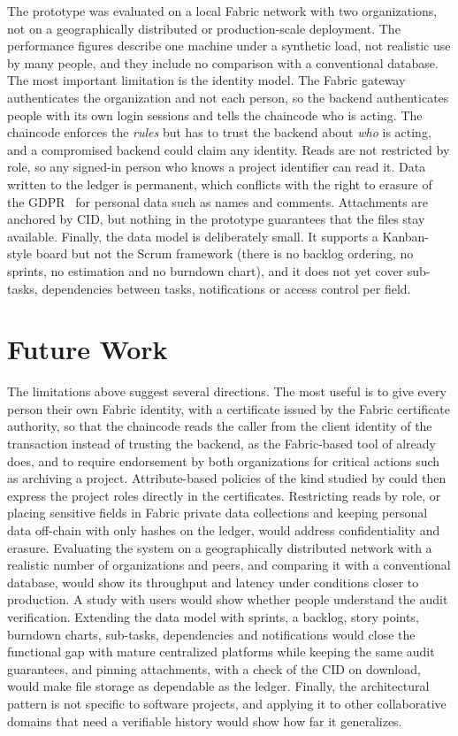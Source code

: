 The prototype was evaluated on a local Fabric network with two organizations, not on a geographically distributed or production-scale deployment. The performance figures describe one machine under a synthetic load, not realistic use by many people, and they include no comparison with a conventional database. The most important limitation is the identity model. The Fabric gateway authenticates the organization and not each person, so the backend authenticates people with its own login sessions and tells the chaincode who is acting. The chaincode enforces the \emph{rules} but has to trust the backend about \emph{who} is acting, and a compromised backend could claim any identity. Reads are not restricted by role, so any signed-in person who knows a project identifier can read it. Data written to the ledger is permanent, which conflicts with the right to erasure of the GDPR~\cite{gdpr} for personal data such as names and comments. Attachments are anchored by CID, but nothing in the prototype guarantees that the files stay available. Finally, the data model is deliberately small. It supports a Kanban-style board but not the Scrum framework (there is no backlog ordering, no sprints, no estimation and no burndown chart), and it does not yet cover sub-tasks, dependencies between tasks, notifications or access control per field.

\section{Future Work}
\label{sec:future-work}

The limitations above suggest several directions. The most useful is to give every person their own Fabric identity, with a certificate issued by the Fabric certificate authority, so that the chaincode reads the caller from the client identity of the transaction instead of trusting the backend, as the Fabric-based tool of \textcite{batista2021} already does, and to require endorsement by both organizations for critical actions such as archiving a project. Attribute-based policies of the kind studied by \textcite{gordijn2022combining} could then express the project roles directly in the certificates. Restricting reads by role, or placing sensitive fields in Fabric private data collections and keeping personal data off-chain with only hashes on the ledger, would address confidentiality and erasure. Evaluating the system on a geographically distributed network with a realistic number of organizations and peers, and comparing it with a conventional database, would show its throughput and latency under conditions closer to production. A study with users would show whether people understand the audit verification. Extending the data model with sprints, a backlog, story points, burndown charts, sub-tasks, dependencies and notifications would close the functional gap with mature centralized platforms while keeping the same audit guarantees, and pinning attachments, with a check of the CID on download, would make file storage as dependable as the ledger. Finally, the architectural pattern is not specific to software projects, and applying it to other collaborative domains that need a verifiable history would show how far it generalizes.
